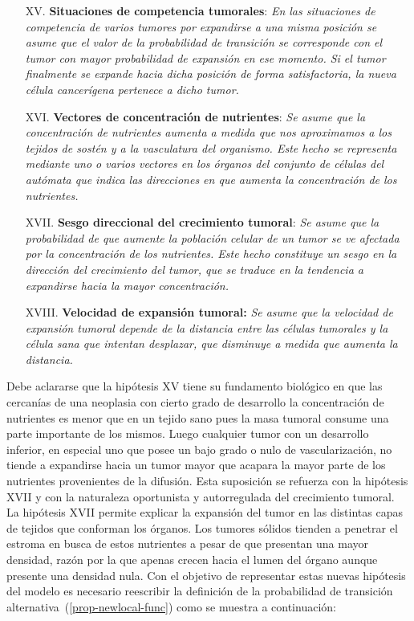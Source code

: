 \begin{itemize}
\item [{XV.}] \textbf{Situaciones de competencia tumorales}: \emph{En las situaciones de competencia de varios tumores por expandirse a una misma posici\'on se asume que el valor de la probabilidad de transici\'on se corresponde con el tumor con mayor probabilidad de expansi\'on en ese momento. Si el tumor finalmente se expande hacia dicha posici\'on de forma satisfactoria, la nueva c\'elula cancer\'igena pertenece a dicho tumor.} \label{XV}

\item [{XVI.}] \textbf{Vectores de concentraci\'on de nutrientes}: \emph{Se asume que la concentraci\'on de nutrientes aumenta a medida que nos aproximamos a los tejidos de sost\'en y a la vasculatura del organismo. Este hecho se representa mediante uno o varios vectores en los \'organos del conjunto de c\'elulas del aut\'omata que indica las direcciones en que aumenta la concentraci\'on de los nutrientes.} \label{XVI}

\item [{XVII.}] \textbf{Sesgo direccional del crecimiento tumoral}: \emph{Se asume que la probabilidad de que aumente la poblaci\'on celular de un tumor se ve afectada por la concentraci\'on de los nutrientes. Este hecho constituye un sesgo en la direcci\'on del crecimiento del tumor, que se traduce en la tendencia a expandirse hacia la mayor concentraci\'on.} \label{XVII}

\item [XVIII.] \textbf{Velocidad de expansi\'on tumoral:} \emph{Se asume que la velocidad de expansi\'on tumoral depende de la distancia entre las c\'elulas tumorales y la c\'elula sana que intentan desplazar, que disminuye a medida que aumenta la distancia.} \label{XVIII}
\end{itemize}

Debe aclararse que la hip\'otesis XV tiene su fundamento biol\'ogico en que las cercan\'ias de una neoplasia con cierto grado de desarrollo la concentraci\'on de nutrientes es menor que en un tejido sano pues la masa tumoral consume una parte importante de los mismos. Luego cualquier tumor con un desarrollo inferior, en especial uno que posee un bajo grado o nulo de vascularizaci\'on, no tiende a expandirse hacia un tumor mayor que acapara la mayor parte de los nutrientes provenientes de la difusi\'on. Esta suposici\'on se refuerza con la hip\'otesis XVII y con la naturaleza oportunista y autorregulada del crecimiento tumoral. La hip\'otesis XVII permite explicar la expansi\'on del tumor en las distintas capas de tejidos que conforman los \'organos. Los tumores s\'olidos tienden a penetrar el estroma en busca de estos nutrientes a pesar de que presentan una mayor densidad, raz\'on por la que apenas crecen hacia el lumen del \'organo aunque presente una densidad nula. Con el objetivo de representar estas nuevas hip\'otesis del modelo es necesario reescribir la definici\'on de la probabilidad de transici\'on alternativa~(\ref{prop-newlocal-func}) como se muestra a continuaci\'on:

